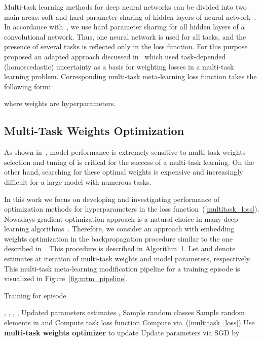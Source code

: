 \documentclass{article}
\begin{document}
Multi-task learning methods for deep neural networks can be divided into two main areas: soft and hard parameter sharing of hidden layers of neural network~\cite{ruder2017overview}. In accordance with~\cite{boiarov2020simultaneous}, we use hard parameter sharing for all hidden layers of a convolutional network. Thus, one neural network is used for all tasks, and the presence of several tasks is reflected only in the loss function. For this purpose~\cite{boiarov2020simultaneous} proposed an adapted approach discussed in~\cite{kendall2018multi} which used task-depended (homoscedastic) uncertainty as a basis for weighting losses in a multi-task learning problem. Corresponding multi-task meta-learning loss function takes the following form:


where weights  are hyperparameters.

\subsection{Multi-Task Weights Optimization}\label{sec:mtm_optimizers}

As shown in~\cite{kendall2018multi}, model performance is extremely sensitive
to multi-task weights selection and tuning of  is critical for the success of a multi-task learning. On the other hand, searching for these optimal weights is expensive and increasingly difficult for a large model with numerous tasks.

In this work we focus on developing and investigating performance of optimization methods for hyperparameters  in the loss function~(\ref{multitask_loss}). Nowadays gradient optimization approach is a natural choice in many deep learning algorithms~\cite{He_2016_CVPR,kendall2018multi}. Therefore, we consider an approach with embedding weights optimization in the backpropagation procedure similar to the one described in~\cite{kendall2018multi}. This procedure is described in Algorithm~1. Let  and  denote estimates at iteration  of multi-task weights and model parameters, respectively. This multi-task meta-learning modification pipeline for a training episode  is visualized in Figure~\ref{fig:mtm_pipeline}.

\begin{algorithm}\label{alg:multi-task_weights_optimizer}
\begin{algorithmic}[1]
\caption{Training for episode }
\renewcommand{\algorithmicrequire}{\textbf{Input:}}
\renewcommand{\algorithmicensure}{\textbf{Output:}}
\REQUIRE , , , , 
\ENSURE Updated parameters estimates , 
\STATE Sample  random classes
\STATE Sample random elements in  and  
\STATE Compute task loss function 
\ENDFOR
\STATE Compute  via~(\ref{multitask_loss})
\STATE Use {\bf multi-task weights optimizer} to update 
\STATE Update parameters  via SGD by 
\end{algorithmic}
\end{algorithm}
\end{document}
